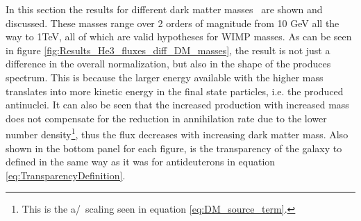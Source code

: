 In this section the results for different dark matter masses \dmm\ are shown and discussed. These masses range over 2 orders of magnitude from 10 GeV all the way to 1TeV, all of which are valid hypotheses for WIMP masses. As can be seen in figure \ref{fig:Results_He3_fluxes_diff_DM_masses}, the result is not just a difference in the overall normalization, but also in the shape of the produces spectrum. This is because the larger energy available with the higher mass translates into more kinetic energy in the final state particles, i.e. the produced antinuclei. It can also be seen that the increased production with increased mass does not compensate for the reduction in annihilation rate due to the lower number density\footnote{This is the a/\dmm\ scaling seen in equation \ref{eq:DM_source_term}.}, thus the flux decreases with increasing dark matter mass. Also shown in the bottom panel for each figure, is the transparency of the galaxy to \ahe\, defined in the same way as it was for antideuterons in equation \ref{eq:TransparencyDefinition}.

